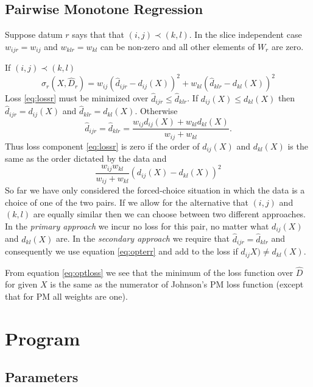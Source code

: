 \documentclass[
  12pt,
]{article}
\begin{document}
\subsection{Pairwise Monotone Regression}\label{pairwise-monotone-regression}

Suppose datum \(r\) says that that \((i,j)\prec(k,l)\). In the slice independent case \(w_{ijr}=w_{ij}\) and \(w_{klr}=w_{kl}\)
can be non-zero and all other elements of \(W_r\) are zero.

If \((i,j)\prec(k,l)\)
\begin{equation}
\sigma_r(X,\hat D_r)=w_{ij}(\hat d_{ijr}-d_{ij}(X))^2+w_{kl}(\hat d_{klr}-d_{kl}(X))^2
\label{eq:lossr}
\end{equation}
Loss \eqref{eq:lossr} must be minimized over \(\hat d_{ijr}\leq\hat d_{klr}\). If \(d_{ij}(X)\leq d_{kl}(X)\)
then \(\hat d_{ijr}=d_{ij}(X)\) and \(\hat d_{klr}=d_{kl}(X)\). Otherwise
\begin{equation}
\hat d_{ijr}=\hat d_{klr}=\frac{w_{ij}d_{ij}(X)+w_{kl}d_{kl}(X)}{w_{ij}+w_{kl}}.
\label{eq:opterr}
\end{equation}
Thus loss component \eqref{eq:lossr} is zero if the order of \(d_{ij}(X)\) and \(d_{kl}(X)\) is the same as the order dictated by the data
and
\begin{equation}
\frac{w_{ij}w_{kl}}{w_{ij}+w_{kl}}(d_{ij}(X)-d_{kl}(X))^2
\label{eq:optloss}
\end{equation}
So far we have only considered the forced-choice situation in which
the data is a choice of one of the two pairs. If we allow for the alternative that \((i,j)\) and \((k,l)\) are equally similar then we can choose between two different approaches. In the \emph{primary approach} we incur no loss for this pair, no matter what \(d_{ij}(X)\) and \(d_{kl}(X)\) are. In the \emph{secondary approach} we require that \(\hat d_{ijr}=\hat d_{klr}\) and consequently we use equation \eqref{eq:opterr} and add to the loss if
\(d_{ij}X)\not= d_{kl}(X)\).

From equation \eqref{eq:optloss} we see that the minimum of the loss function over \(\hat D\) for given \(X\) is the same as the numerator of Johnson's PM loss function (except that for PM all weights are one).

\section{Program}\label{program}

\subsection{Parameters}\label{parameters}
\end{document}
